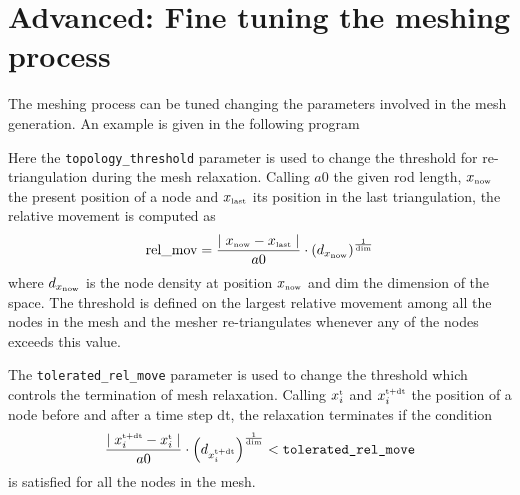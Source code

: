 \documentclass[10pt,a4paper]{book}
\newcommand{\py}[1]{\texttt{\color{blue}#1}}
\begin{document}





%
%
%
%

\chapter{Advanced: Fine tuning the meshing process}
\label{chap:finetunemeshing}
The meshing process can be tuned changing the parameters involved in
the mesh generation. An example is given in the following program


Here the \py{topology\_threshold} parameter is used to change the
threshold for re-triangulation during the mesh relaxation. Calling
$a0$ the given rod length, $x_{\textrm{\tiny now}}$ the
present position of a node and $x_{\textrm{\tiny last}}$ its position
in the last triangulation, the relative movement is computed as
\begin{equation}
  \textrm{rel\_mov} = \frac{\mid x_{\textrm{\tiny now}} - x_{\textrm{\tiny
      last}} \mid}{a0} \cdot \left( d_{x_\textrm{\tiny now}}
  \right)^{\frac{1}{\textrm{\tiny dim}}}  \nonumber
\end{equation}
where $d_{x_\textrm{\tiny now}}$ is the node density at
position $x_\textrm{\tiny now}$ and $\textrm{dim}$ the dimension of
the space. The threshold is defined on the
largest relative movement among all the nodes in the mesh and the
mesher re-triangulates whenever any of the nodes exceeds this value. 

The \py{tolerated\_rel\_move} parameter is used to change the
threshold which controls the termination of mesh relaxation.
Calling $x_i^{\textrm{\tiny t}}$ and $x_i^{\textrm{\tiny t+dt}}$
the position of a node before and after a time step dt,  
the relaxation terminates if the condition 
\begin{equation}
  \frac{\mid x_i^{\textrm{\tiny t+dt}} - x_i^{\textrm{\tiny t}} \mid}
  {a0} \cdot \left( d_{x_i^{\textrm{\tiny t+dt}}} \right)
  ^{\frac{1}{\textrm{\tiny dim}}} <
  \texttt{tolerated\_rel\_move}
  \nonumber
\end{equation}
is satisfied for all the nodes in the mesh.
\end{document}
